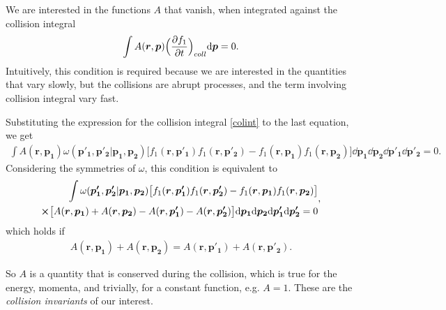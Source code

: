 We are interested in the functions $A$ that vanish, when integrated against the collision integral
\begin{align*}
\int A(\bm{r},\bm{p})  \Big( \frac{\partial f_1}{\partial t} \Big)_{coll} \mathrm{d} \bm{p} = 0.
\end{align*}
Intuitively, this condition is required because we are interested in the quantities that vary slowly, but the collisions are abrupt processes, and the term involving collision integral vary fast.

Substituting the expression for the collision integral \ref{colint} to the last equation, we get
\begin{align*}
\int A(\bm{r},\bm{p_1}) \omega(\bm{p'_1},\bm{p'_2} | \bm{p_1}, \bm{p_2}) \big[f_1(\bm{r},\bm{p'_1})f_1(\bm{r},\bm{p'_2}) - f_1(\bm{r},\bm{p_1})f_1(\bm{r},\bm{p_2}) \big] \dd \bm{p_1} \dd \bm{p_2} \dd \bm{p'_1} \dd \bm{p'_2} = 0.
\end{align*}
Considering the symmetries of $\omega$, this condition is equivalent to
\begin{align*}
\begin{split}
\int \omega(\bm{p'_1},\bm{p'_2} | \bm{p_1}, \bm{p_2}) \big[f_1(\bm{r},\bm{p'_1})f_1(\bm{r},\bm{p'_2}) - f_1(\bm{r},\bm{p_1})f_1(\bm{r},\bm{p_2}) \big] \\ \cross \big[A(\bm{r},\bm{p_1}) + A(\bm{r},\bm{p_2}) - A(\bm{r},\bm{p'_1}) - A(\bm{r},\bm{p'_2}) \big] \mathrm{d} \bm{p_1} \mathrm{d} \bm{p_2} \mathrm{d} \bm{p'_1} \mathrm{d} \bm{p'_2} = 0
\end{split},
\end{align*}
which holds if
\begin{align*}
A(\bm{r},\bm{p_1}) + A(\bm{r},\bm{p_2}) = A(\bm{r},\bm{p'_1}) + A(\bm{r},\bm{p'_2}).
\end{align*}

So $A$ is a quantity that is conserved during the collision, which is true for the energy, momenta, and trivially, for a constant function, e.g. $A=1$.
These are the \textit{collision invariants} of our interest.

